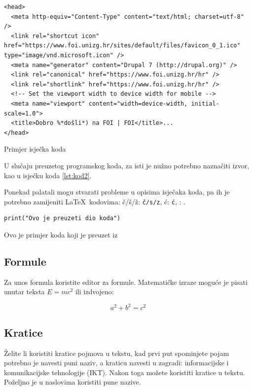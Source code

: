 \documentclass[]{foi}
\begin{document}
\begin{listing}
    \begin{verbatim}
<head>
  <meta http-equiv="Content-Type" content="text/html; charset=utf-8" />
  <link rel="shortcut icon" href="https://www.foi.unizg.hr/sites/default/files/favicon_0_1.ico" type="image/vnd.microsoft.icon" />
  <meta name="generator" content="Drupal 7 (http://drupal.org)" />
  <link rel="canonical" href="https://www.foi.unizg.hr/hr" />
  <link rel="shortlink" href="https://www.foi.unizg.hr/hr" />
  <!-- Set the viewport width to device width for mobile -->
  <meta name="viewport" content="width=device-width, initial-scale=1.0">
  <title>Dobro %*došli*) na FOI | FOI</title>...
</head>
    \end{verbatim}
    \caption{Primjer isječka koda}
    \label{lst:dva}
\end{listing}

U slučaju preuzetog programskog koda, za isti je nužno potrebno naznačiti izvor, kao u isječku koda \ref{lst:kod2}. 

Ponekad palatali mogu stvarati probleme u opisima isječaka koda, pa ih je potrebno zamijeniti \LaTeX\ kodovima: \v{c}/\v{s}/\v{z}: \texttt{\v{c/s/z}}, \'{c}: \texttt{\'{c}}, \dj: \texttt{\dj}.


\begin{listing}
    \begin{verbatim}
print("Ovo je preuzeti dio koda")
    \end{verbatim}
    \caption[Ovo je primjer koda koji je preuzet]{Ovo je primjer koda koji je preuzet iz \cite[str. 23]{russell2022ArtificialIntelligenceModern}}
    \label{lst:kod2}
\end{listing}



\subsection{Formule}

Za unos formula koristite editor za formule. Matematičke izraze moguće je pisati unutar teksta $E = mc^2$ ili izdvojeno:
    
$$
a^2 + b^2 = c^2
$$

\subsection{Kratice}

Želite li koristiti kratice pojmova u tekstu, kad prvi put spominjete pojam potrebno je navesti puni naziv, a kraticu navesti u zagradi: informacijske i komunikacijske tehnologije (IKT). Nakon toga možete koristiti kratice u tekstu. Poželjno je u naslovima koristiti pune nazive.
\end{document}
